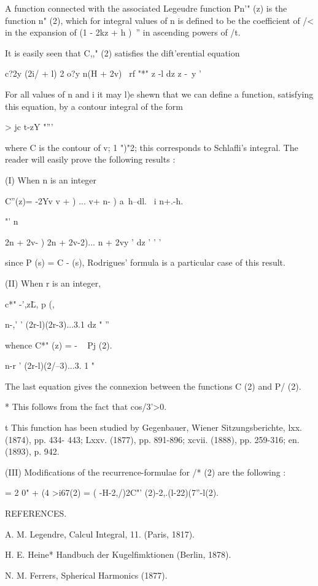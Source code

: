 {{{A function connected with the associated Legeudre function Pn'" (z) is
the function n" (2), which for integral values of n is defined to be
the coefficient of /< in the expansion of (1 - 2kz + h )~'' in
ascending powers of /t.

It is easily seen that C,," (2) satisfies the dift'erential equation

c?2y (2i/ + l) 2 o?y n(H + 2v) \ rf "*" z -l dz z -\ y '

For all values of n and i it may l)e shewn that we can define a
function, satisfying this equation, by a contour integral of the form

  > jc t-zY "'''

where C is the contour of v; 1 ")"2; this corresponds to Schlafli's
integral. The reader will easily prove the following results :

(I) When n is an integer

C''(z)= -2Yv v + ) ... v+ n- ) a\, h--dl. \ i n+.-h.

"' n\ \ {2n + 2v- ) 2n + 2v-2)... n + 2vy ' dz ' ' '

since P (s) = C - (s), Rodrigues' formula is a particular case of this
result.

(II) When r is an integer,

c*" -',z\= L, p (,\

n-,' ' (2r-l)(2r-3)...3.1 dz " ''

whence C*" (z) = - ~ Pj (2).

n-r ' (2r-l)(2/--3)...3. 1 "

The last equation gives the connexion between the functions C (2) and
P/ (2).

* This follows from the fact that cos/3'>0.

t This function has been studied by Gegenbauer, Wiener
Sitzungsberichte, lxx. (1874), pp. 434- 443; Lxxv. (1877), pp.
891-896; xcvii. (1888), pp. 259-316; en. (1893), p. 942.

%
%

(III) Modifications of the recurrence-formulae for /* (2) are the
following :

   = 2 0" + (4 >i67(2) = ( -H-2,/)2C"' (2)-2,.(l-22)(7''-l(2).

REFERENCES.

A. M. Legendre, Calcul Integral, 11. (Paris, 1817).

H. E. Heine* Handbuch der Kugelfimktionen (Berlin, 1878).

N. M. Ferrers, Spherical Harmonics (1877).

}}}}
